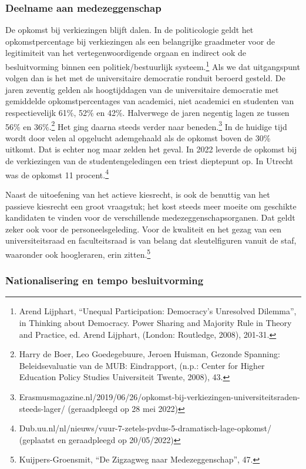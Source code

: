 \documentclass[empirical, authordate, ]{new-jote-article}
\begin{document}
	\subsubsection{Deelname aan medezeggenschap }



	De opkomst bij verkiezingen blijft dalen. In de politicologie geldt het opkomstpercentage bij verkiezingen als een belangrijke graadmeter voor de legitimiteit van het vertegenwoordigende orgaan en indirect ook de besluitvorming binnen een politiek/bestuurlijk systeem.\footnote{Arend Lijphart, “Unequal Participation: Democracy's Unresolved Dilemma”, in Thinking about Democracy. Power Sharing and Majority Rule in Theory and Practice, ed. Arend Lijphart, (London: Routledge, 2008), 201-31.} Als we dat uitgangspunt volgen dan is het met de universitaire democratie ronduit beroerd gesteld. De jaren zeventig gelden als hoogtijddagen van de universitaire democratie met gemiddelde opkomstpercentages van academici, niet academici en studenten van respectievelijk 61\%, 52\% en 42\%. Halverwege de jaren negentig lagen ze tussen 56\% en 36\%.\footnote{Harry de Boer, Leo Goedegebuure, Jeroen Huisman, Gezonde Spanning: Beleidsevaluatie van de MUB: Eindrapport, (n.p.: Center for Higher Education Policy Studies Universiteit Twente, 2008), 43.} Het ging daarna steeds verder naar beneden.\footnote{Erasmusmagazine.nl/2019/06/26/opkomst-bij-verkiezingen-universiteitsraden-steeds-lager/ (geraadpleegd op 28 mei 2022)} In de huidige tijd wordt door velen al opgelucht ademgehaald als de opkomst boven de 30\% uitkomt. Dat is echter nog maar zelden het geval. In 2022 leverde de opkomst bij de verkiezingen van de studentengeledingen een triest dieptepunt op. In Utrecht was de opkomst 11 procent.\footnote{Dub.uu.nl/nl/nieuws/vuur-7-zetels-pvdus-5-dramatisch-lage-opkomst/ (geplaatst en geraadpleegd op 20/05/2022)}



	Naast de uitoefening van het actieve kiesrecht, is ook de benuttig van het passieve kiesrecht een groot vraagstuk; het kost steeds meer moeite om geschikte kandidaten te vinden voor de verschillende medezeggenschapsorganen. Dat geldt zeker ook voor de personeelsgeleding. Voor de kwaliteit en het gezag van een universiteitsraad en faculteitsraad is van belang dat sleutelfiguren vanuit de staf, waaronder ook hoogleraren, erin zitten.\footnote{Kuijpers-Groensmit, “De Zigzagweg naar Medezeggenschap”, 47.}



	\subsubsection{Nationalisering en tempo besluitvorming}
\end{document}
